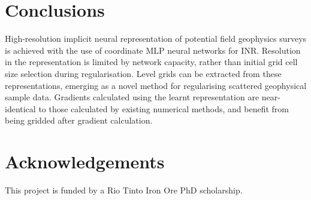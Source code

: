 \documentclass[manuscript.tex]{subfiles}
\begin{document}
\section{Conclusions}
High-resolution implicit neural representation of potential field geophysics surveys is achieved with the use of coordinate MLP neural networks for INR\@.
Resolution in the representation is limited by network capacity, rather than initial grid cell size selection during regularisation.
Level grids can be extracted from these representations, emerging as a novel method for regularising scattered geophysical sample data.
Gradients calculated using the learnt representation are near-identical to those calculated by existing numerical methods, and benefit from being gridded after gradient calculation.

\section{Acknowledgements}
This project is funded by a Rio Tinto Iron Ore PhD scholarship.

\printbibliography{}



\end{document}
